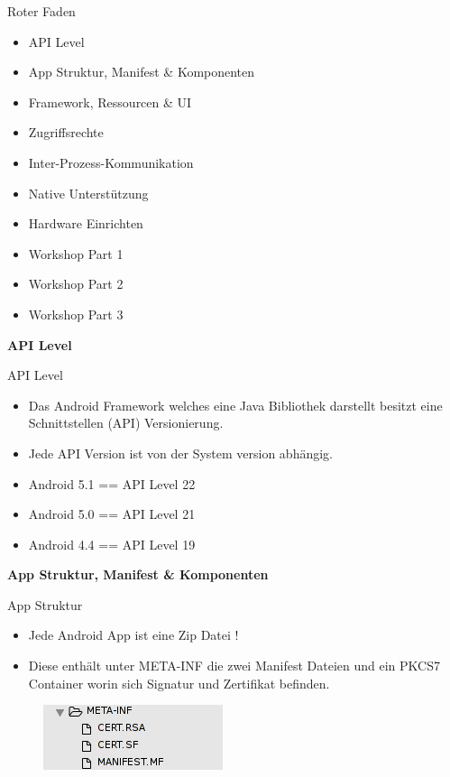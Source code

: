 \documentclass{beamer}
\begin{document}
\begin{frame}{Roter Faden}
\begin{itemize}
\item API Level
\item App Struktur, Manifest \& Komponenten
\item Framework, Ressourcen \& UI
\item Zugriffsrechte 
\item Inter-Prozess-Kommunikation
\item Native Unterstützung
\item Hardware Einrichten
\item Workshop Part 1
\item Workshop Part 2
\item Workshop Part 3
\end{itemize}
\end{frame}

\begin{frame}
\begin{center}
\huge\textbf{API Level}
\end{center}
\end{frame}

\begin{frame}{API Level}
\begin{itemize}
\item Das Android Framework welches eine Java Bibliothek darstellt besitzt eine Schnittstellen (API) Versionierung.
\item Jede API Version ist von der System version abhängig.
\item Android 5.1 == API Level 22
\item Android 5.0 == API Level 21
\item Android 4.4 == API Level 19
\end{itemize}
\end{frame}

\begin{frame}
\begin{center}
\huge\textbf{App Struktur, Manifest \& Komponenten}
\end{center}
\end{frame}

\begin{frame}{App Struktur}
\begin{itemize}
\item Jede Android App ist eine Zip Datei !
\item Diese enthält unter META-INF die zwei Manifest Dateien und ein PKCS7 Container worin sich Signatur und Zertifikat befinden.
\end{itemize}
\begin{figure}[hb]
 \centering
 \includegraphics[scale=0.6]{app-contents-1}
\end{figure}
\end{frame}
\end{document}
